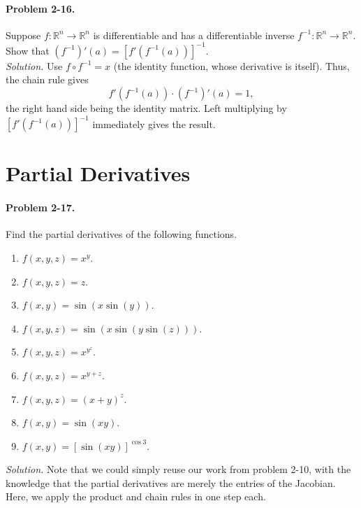 \documentclass[11pt]{report}
\newcommand{\R}{\mathbb{R}}
\newcommand{\problem}[1]{\paragraph{Problem #1.}}
\newcommand{\solution}{\noindent\textit{Solution.} }
\begin{document}
    \problem{2-16} Suppose $f\colon \R^n \to \R^n$ is differentiable and has a
    differentiable inverse $f^{-1}\colon \R^n \to \R^n$. Show that $(f^{-1})'(a) =
    [f'(f^{-1}(a))]^{-1}$. \\

    \solution Use $f\circ f^{-1} = x$ (the identity function, whose derivative is
    itself). Thus, the chain rule gives \[
        f'(f^{-1}(a)) \cdot (f^{-1})'(a) = 1,
    \] the right hand side being the identity matrix. Left multiplying by
    $[f'(f^{-1}(a))]^{-1}$ immediately gives the result.



    \section{Partial Derivatives}
    
    \problem{2-17} Find the partial derivatives of the following functions.
    \begin{enumerate}
        \itemsep0em
        \item $f(x, y, z) = x^y$.
        \item $f(x, y, z) = z$.
        \item $f(x, y) = \sin(x\sin(y))$.
        \item $f(x, y, z) = \sin(x\sin(y\sin(z)))$.
        \item $f(x, y, z) = x^{y^z}$.
        \item $f(x, y, z) = x^{y + z}$.
        \item $f(x, y, z) = (x + y)^z$.
        \item $f(x, y) = \sin(xy)$.
        \item $f(x, y) = [\sin(xy)]^{\cos{3}}$.
    \end{enumerate}

    \solution Note that we could simply reuse our work from problem 2-10, with the
    knowledge that the partial derivatives are merely the entries of the Jacobian.
    Here, we apply the product and chain rules in one step each.
\end{document}
